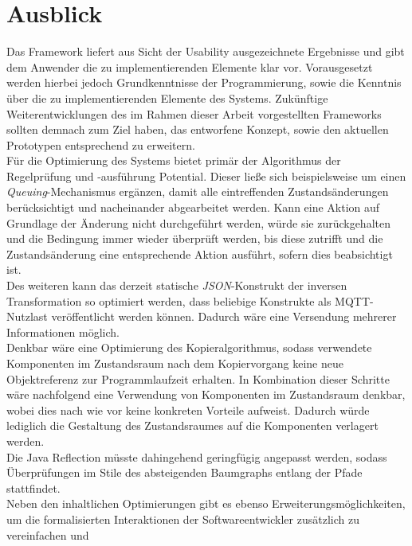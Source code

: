 \chapter{Ausblick}
\label{chap:ausblick}
    Das Framework liefert aus Sicht der Usability ausgezeichnete Ergebnisse und gibt dem Anwender die zu implementierenden Elemente klar vor. 
    Vorausgesetzt werden hierbei jedoch Grundkenntnisse der Programmierung, sowie die Kenntnis über die zu implementierenden Elemente des Systems. 
    Zukünftige Weiterentwicklungen des im Rahmen dieser Arbeit vorgestellten Frameworks sollten demnach zum Ziel haben, das entworfene Konzept, 
    sowie den aktuellen Prototypen entsprechend zu erweitern. 
    \\
    \linebreak
    Für die Optimierung des Systems bietet primär der Algorithmus der Regelprüfung und -ausführung Potential. Dieser ließe sich beispielsweise 
    um einen \textit{Queuing}-Mechanismus ergänzen, damit alle eintreffenden Zustandsänderungen berücksichtigt und nacheinander abgearbeitet werden. 
    Kann eine Aktion auf Grundlage der Änderung nicht durchgeführt werden, würde sie zurückgehalten und die Bedingung immer wieder überprüft 
    werden, bis diese zutrifft und die Zustandsänderung eine entsprechende Aktion ausführt, sofern dies beabsichtigt ist. 
    \\
    \linebreak
    Des weiteren kann das derzeit statische \textit{JSON}-Konstrukt der inversen Transformation so optimiert werden, dass beliebige Konstrukte 
    als \acs{MQTT}-Nutzlast veröffentlicht werden können. Dadurch wäre eine Versendung mehrerer Informationen möglich. 
    \\
    Denkbar wäre eine Optimierung des Kopieralgorithmus, sodass verwendete Komponenten im Zustandsraum nach dem Kopiervorgang keine neue 
    Objektreferenz zur Programmlaufzeit erhalten. In Kombination dieser Schritte wäre nachfolgend eine Verwendung von Komponenten im Zustandsraum denkbar, wobei 
    dies nach wie vor keine konkreten Vorteile aufweist. Dadurch würde lediglich die Gestaltung des Zustandsraumes auf die Komponenten verlagert werden. 
    \\
    Die Java Reflection müsste dahingehend geringfügig angepasst werden, sodass Überprüfungen im Stile des absteigenden Baumgraphs entlang der Pfade stattfindet.
    \\
    \linebreak
    Neben den inhaltlichen Optimierungen gibt es ebenso Erweiterungsmöglichkeiten, um die formalisierten Interaktionen der Softwareentwickler zusätzlich zu vereinfachen und 
